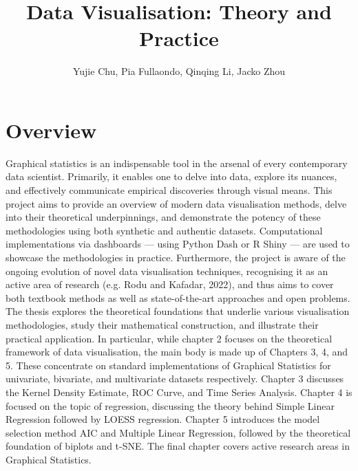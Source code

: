 \documentclass{article}\usepackage[]{graphicx}\usepackage[]{xcolor}
\title{Data Visualisation: Theory and Practice}
\author{Yujie Chu, Pia Fullaondo, Qinqing Li, Jacko Zhou}
\numberwithin{equation}{section}
\begin{document}
\maketitle 

\newpage
\tableofcontents

\newpage  %

\section*{Overview}


\noindent
Graphical statistics is an indispensable tool in the arsenal of every contemporary data scientist. Primarily, it enables one to delve into data, explore its nuances, and effectively communicate empirical discoveries through visual means. This project aims to provide an overview of modern data visualisation methods, delve into their theoretical underpinnings, and demonstrate the potency of these methodologies using both synthetic and authentic datasets. Computational implementations via dashboards — using Python Dash or R Shiny — are used to showcase the methodologies in practice. Furthermore, the project is aware of the ongoing evolution of novel data visualisation techniques, recognising it as an active area of research (e.g. Rodu and Kafadar, 2022), and thus aims to cover both textbook methods as well as state-of-the-art approaches and open problems.\\

\noindent
The thesis explores the theoretical foundations that underlie various visualisation methodologies, study their mathematical construction, and illustrate their practical application. In particular, while chapter 2 focuses on the theoretical framework of data visualisation, the main body is made up of Chapters 3, 4, and 5. These concentrate on standard implementations of Graphical Statistics for univariate, bivariate, and multivariate datasets respectively. Chapter 3 discusses the Kernel Density Estimate, ROC Curve, and Time Series Analysis. Chapter 4 is focused on the topic of regression, discussing the theory behind Simple Linear Regression followed by LOESS regression. Chapter 5 introduces the model selection method AIC and Multiple Linear Regression, followed by the theoretical foundation of biplots and t-SNE. The final chapter covers active research areas in Graphical Statistics. \\
\end{document}
